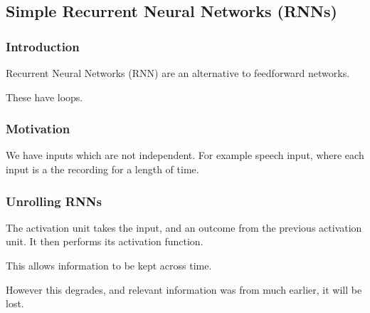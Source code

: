 
\subsection{Simple Recurrent Neural Networks (RNNs)}

\subsubsection{Introduction}

Recurrent Neural Networks (RNN) are an alternative to feedforward networks.

These have loops.

\subsubsection{Motivation}

We have inputs which are not independent. For example speech input, where each input is a the recording for a length of time.

\subsubsection{Unrolling RNNs}

The activation unit takes the input, and an outcome from the previous activation unit. It then performs its activation function.

This allows information to be kept across time.

However this degrades, and relevant information was from much earlier, it will be lost.

